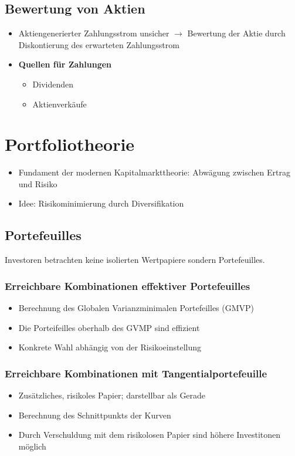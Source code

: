 \subsection{Bewertung von Aktien}
\begin{itemize}
	\item Aktiengenerierter Zahlungsstrom unsicher $\rightarrow$ Bewertung der Aktie durch Diskontierung des erwarteten Zahlungsstrom
	\item \textbf{Quellen für Zahlungen}
	\begin{itemize}
		\item Dividenden
		\item Aktienverkäufe
	\end{itemize}
\end{itemize}



\section{Portfoliotheorie}
\begin{itemize}
	\item Fundament der modernen Kapitalmarkttheorie: Abwägung zwischen Ertrag und Risiko
	\item Idee: Risikominimierung durch Diversifikation
\end{itemize}


\subsection{Portefeuilles}
Investoren betrachten keine isolierten Wertpapiere sondern Portefeuilles.

\subsubsection{Erreichbare Kombinationen effektiver Portefeuilles}
\begin{itemize}
	\item Berechnung des Globalen Varianzminimalen Portefeilles (GMVP)
	\item Die Porteifeilles oberhalb des GVMP sind effizient
	\item Konkrete Wahl abhängig von der Risikoeinstellung
\end{itemize}

\subsubsection{Erreichbare Kombinationen mit Tangentialportefeuille}
\begin{itemize}
	\item Zusätzliches, risikoles Papier; darstellbar als Gerade
	\item Berechnung des Schnittpunkts der Kurven
	\item Durch Verschuldung mit dem risikolosen Papier sind höhere Investitonen möglich
\end{itemize}


